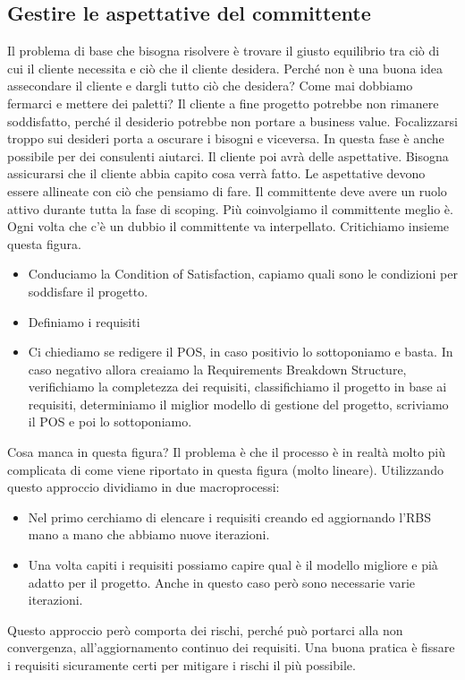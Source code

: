 \subsection{Gestire le aspettative del committente}
Il problema di base che bisogna risolvere è trovare il giusto equilibrio tra ciò di cui il cliente necessita e ciò che il cliente desidera. Perché non è una buona idea assecondare il cliente e dargli tutto ciò che desidera? Come mai dobbiamo fermarci e mettere dei paletti?\newline
Il cliente a fine progetto potrebbe non rimanere soddisfatto, perché il desiderio potrebbe non portare a business value. Focalizzarsi troppo sui desideri porta a oscurare i bisogni e viceversa. In questa fase è anche possibile per dei consulenti aiutarci. Il cliente poi avrà delle aspettative. Bisogna assicurarsi che il cliente abbia capito cosa verrà fatto. Le aspettative devono essere allineate con ciò che pensiamo di fare. Il committente deve avere un ruolo attivo durante tutta la fase di scoping. Più coinvolgiamo il committente meglio è. Ogni volta che c'è un dubbio il committente va interpellato.
Critichiamo insieme questa figura.
\begin{itemize}
	\item Conduciamo la Condition of Satisfaction, capiamo quali sono le condizioni per soddisfare il progetto.
	\item Definiamo i requisiti
	\item Ci chiediamo se redigere il POS, in caso positivio lo sottoponiamo e basta. In caso negativo allora creaiamo la Requirements Breakdown Structure, verifichiamo la completezza dei requisiti, classifichiamo il progetto in base ai requisiti, determiniamo il miglior modello di gestione del progetto, scriviamo il POS e poi lo sottoponiamo.
\end{itemize}
Cosa manca in questa figura? Il problema è che il processo è in realtà molto più complicata di come viene riportato in questa figura (molto lineare).
Utilizzando questo approccio dividiamo in due macroprocessi:
\begin{itemize}
	\item Nel primo cerchiamo di elencare i requisiti creando ed aggiornando l'RBS mano a mano che abbiamo nuove iterazioni.
	\item Una volta capiti i requisiti possiamo capire qual è il modello migliore e pià adatto per il progetto. Anche in questo caso però sono necessarie varie iterazioni.
\end{itemize}
Questo approccio però comporta dei rischi, perché può portarci alla non convergenza, all'aggiornamento continuo dei requisiti. Una buona pratica è fissare i requisiti sicuramente certi per mitigare i rischi il più possibile. 
